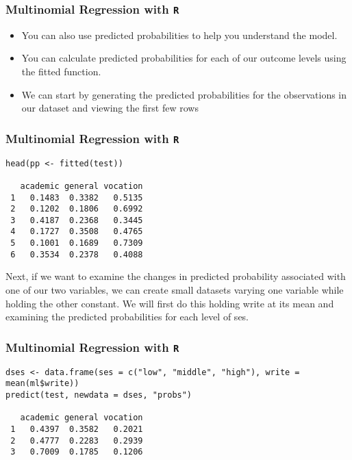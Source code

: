 \documentclass[00-GLMregslides.tex]{subfiles}
\begin{document}
\begin{frame}[fragile]

\frametitle{Multinomial Regression with \texttt{R}}
\Large
\begin{itemize}
\item You can also use predicted probabilities to help you understand the model. 
\item You can calculate predicted probabilities for each of our outcome levels using the fitted function. 
\item We can start by generating the predicted probabilities for the observations in our dataset and viewing the first few rows
\end{itemize}
\end{frame}
\begin{frame}[fragile]

\frametitle{Multinomial Regression with \texttt{R}}
\Large
\begin{verbatim}
head(pp <- fitted(test))
 
   academic general vocation
 1   0.1483  0.3382   0.5135
 2   0.1202  0.1806   0.6992
 3   0.4187  0.2368   0.3445
 4   0.1727  0.3508   0.4765
 5   0.1001  0.1689   0.7309
 6   0.3534  0.2378   0.4088
\end{verbatim} 
Next, if we want to examine the changes in predicted probability associated with one of our two variables, we can create small datasets varying one 
variable while holding the other constant. We will first do this holding write at its mean and examining the predicted probabilities for each level of ses.
 
\end{frame}
\begin{frame}[fragile]

\frametitle{Multinomial Regression with \texttt{R}}
\Large
\begin{verbatim}
dses <- data.frame(ses = c("low", "middle", "high"), write = mean(ml$write))
predict(test, newdata = dses, "probs")
 
   academic general vocation
 1   0.4397  0.3582   0.2021
 2   0.4777  0.2283   0.2939
 3   0.7009  0.1785   0.1206
\end{verbatim}
\end{frame}
\end{document}
